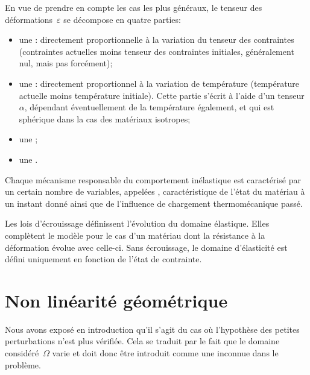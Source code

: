 \bigskip
En vue de prendre en compte les cas les plus généraux, le tenseur des déformations~$\varepsilon$ se décompose en quatre parties:
\begin{itemize}
	\item une : directement proportionnelle à la variation du tenseur des contraintes (contraintes actuelles moins tenseur des contraintes initiales, généralement nul, mais pas forcément);
	\item une : directement proportionnel à la variation de température (température actuelle moins température initiale). Cette partie s'écrit à l'aide d'un tenseur~$\alpha$, dépendant éventuellement de la température également, et qui est sphérique dans la cas des matériaux isotropes;
	\item une ;
	\item une .
\end{itemize}

\medskip
Chaque mécanisme responsable du comportement inélastique est caractérisé par un certain nombre de variables, appelées , caractéristique de l'état du matériau à un instant donné ainsi que de l'influence de chargement thermomécanique passé.

Les lois d'écrouissage définissent l'évolution du domaine élastique. Elles complètent le modèle pour le cas d'un matériau dont la résistance à la déformation évolue avec celle-ci. Sans écrouissage, le domaine d'élasticité est défini uniquement en fonction de l'état de contrainte.






\medskip
\section{Non linéarité géométrique}\label{Sec-NLg}

Nous avons exposé en introduction qu'il s'agit du cas où l'hypothèse des petites perturbations n'est plus vérifiée. Cela se traduit par le fait que le domaine considéré~$\Omega$ varie et doit donc être introduit comme une inconnue dans le problème.

